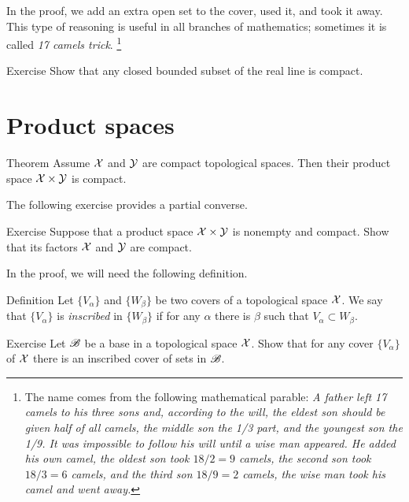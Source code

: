 In the proof, we add an extra open set to the cover, used it, and took it away.
This type of reasoning is useful in all branches of mathematics;
sometimes it is called \emph{17 camels trick}.%
\footnote{The name comes from the following mathematical parable:
\textit{A father left 17 camels to his three sons and, according to the will,
the eldest son should be given half of all camels,
the middle son the 1/3 part,
and the youngest son the 1/9.
It was impossible to follow his will until a wise man appeared.
He added his own camel, the oldest son took $18/2=9$ camels, the second son took $18/3=6$ camels, and the third son $18/9=2$ camels, the wise man took his camel and went away.}}


\begin{thm}{Exercise}
Show that any closed bounded subset of the real line is compact.
\end{thm}

 
\section{Product spaces}

\begin{thm}{Theorem}\label{thm:compact-product}
Assume $\mathcal{X}$ and $\mathcal{Y}$ are compact topological spaces.
Then their product space $\mathcal{X}\times\mathcal{Y}$ is compact.
\end{thm}

The following exercise provides a partial converse.

\begin{thm}{Exercise}
Suppose that a product space $\mathcal{X}\times\mathcal{Y}$ is nonempty and compact.
Show that its factors $\mathcal{X}$ and $\mathcal{Y}$ are compact.
\end{thm} 


In the proof, we will need the following definition.

\begin{thm}{Definition}
Let $\{V_\alpha\}$ and $\{W_\beta\}$ be two covers of a topological space $\mathcal{X}$.
We say that $\{V_\alpha\}$ is \emph{inscribed} in $\{W_\beta\}$ if for any $\alpha$ there is $\beta$ such that $V_\alpha\subset W_\beta$.
\end{thm}

\begin{thm}{Exercise}
Let $\mathscr{B}$ be a base in a topological space $\mathcal{X}$.
Show that for any cover $\{V_\alpha\}$ of $\mathcal{X}$ there is an inscribed cover of sets in $\mathscr{B}$.
\end{thm}


